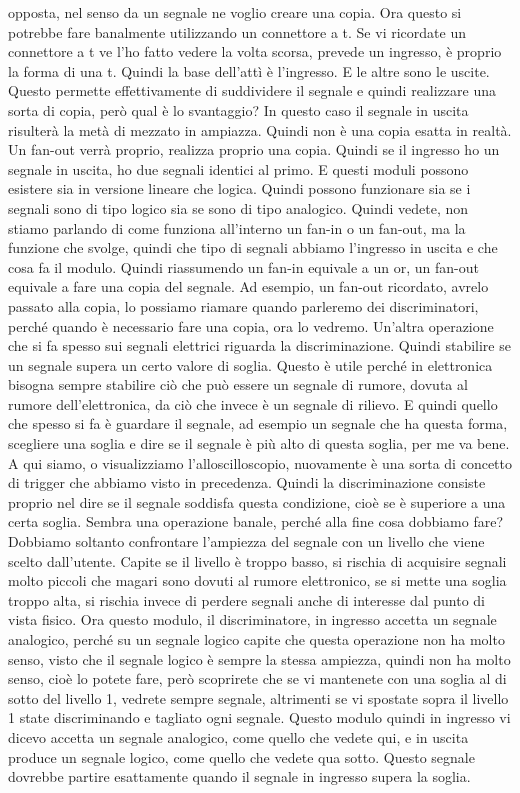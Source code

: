 opposta, nel senso da un segnale ne voglio creare una copia. Ora questo si potrebbe fare banalmente utilizzando un connettore a t. Se vi ricordate un connettore a t ve l'ho fatto vedere la volta scorsa, prevede un ingresso, è proprio la forma di una t. Quindi la base dell'attì è l'ingresso. E le altre sono le uscite. Questo permette effettivamente di suddividere il segnale e quindi realizzare una sorta di copia, però qual è lo svantaggio? In questo caso il segnale in uscita risulterà la metà di mezzato in ampiazza. Quindi non è una copia esatta in realtà. Un fan-out verrà proprio, realizza proprio una copia. Quindi se il ingresso ho un segnale in uscita, ho due segnali identici al primo. E questi moduli possono esistere sia in versione lineare che logica. Quindi possono funzionare sia se i segnali sono di tipo logico sia se sono di tipo analogico. Quindi vedete, non stiamo parlando di come funziona all'interno un fan-in o un fan-out, ma la funzione che svolge, quindi che tipo di segnali abbiamo l'ingresso in uscita e che cosa fa il modulo. Quindi riassumendo un fan-in equivale a un or, un fan-out equivale a fare una copia del segnale. Ad esempio, un fan-out ricordato, avrelo passato alla copia, lo possiamo riamare quando parleremo dei discriminatori, perché quando è necessario fare una copia, ora lo vedremo. Un'altra operazione che si fa spesso sui segnali elettrici riguarda la discriminazione. Quindi stabilire se un segnale supera un certo valore di soglia. Questo è utile perché in elettronica bisogna sempre stabilire ciò che può essere un segnale di rumore, dovuta al rumore dell'elettronica, da ciò che invece è un segnale di rilievo. E quindi quello che spesso si fa è guardare il segnale, ad esempio un segnale che ha questa forma, scegliere una soglia e dire se il segnale è più alto di questa soglia, per me va bene. A qui siamo, o visualizziamo l'alloscilloscopio, nuovamente è una sorta di concetto di trigger che abbiamo visto in precedenza. Quindi la discriminazione consiste proprio nel dire se il segnale soddisfa questa condizione, cioè se è superiore a una certa soglia. Sembra una operazione banale, perché alla fine cosa dobbiamo fare? Dobbiamo soltanto confrontare l'ampiezza del segnale con un livello che viene scelto dall'utente. Capite se il livello è troppo basso, si rischia di acquisire segnali molto piccoli che magari sono dovuti al rumore elettronico, se si mette una soglia troppo alta, si rischia invece di perdere segnali anche di interesse dal punto di vista fisico. Ora questo modulo, il discriminatore, in ingresso accetta un segnale analogico, perché su un segnale logico capite che questa operazione non ha molto senso, visto che il segnale logico è sempre la stessa ampiezza, quindi non ha molto senso, cioè lo potete fare, però scoprirete che se vi mantenete con una soglia al di sotto del livello 1, vedrete sempre segnale, altrimenti se vi spostate sopra il livello 1 state discriminando e tagliato ogni segnale. Questo modulo quindi in ingresso vi dicevo accetta un segnale analogico, come quello che vedete qui, e in uscita produce un segnale logico, come quello che vedete qua sotto. Questo segnale dovrebbe partire esattamente quando il segnale in ingresso supera la soglia. 


